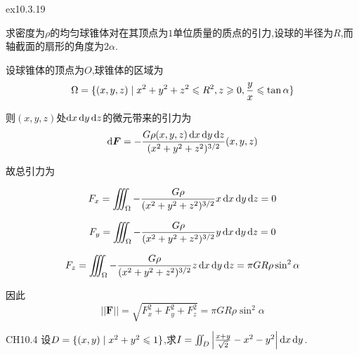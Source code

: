 \begin{exercise}
    {ex10.3.19}


    求密度为$\rho$的均匀球锥体对在其顶点为$1$单位质量的质点的引力,设球的半径为$R$,而轴截面的扇形的角度为$2\alpha$.
\end{exercise}


\begin{solution}
    设球锥体的顶点为$O$,球锥体的区域为$$\Omega = \{ (x,y,z) \mid x^2 + y^2 + z^2 \leqslant R^2, z \geqslant 0, \frac{y}{x} \leqslant \tan \alpha \}$$

    则$(x,y,z)$处$\operatorname{d\!} x \operatorname{d\!} y \operatorname{d\!} z$的微元带来的引力为$$\operatorname{d\!} \bm F = -\frac{G \rho(x,y,z) \operatorname{d\!} x \operatorname{d\!} y \operatorname{d\!} z}{(x^2 + y^2 + z^2)^{3/2}} (x,y,z)$$

    故总引力为

    $$F_x = \iiint_{\Omega} -\frac{G \rho}{(x^2 + y^2 + z^2)^{3/2}} x \operatorname{d\!} x \operatorname{d\!} y \operatorname{d\!} z= 0 $$

    $$F_y = \iiint_{\Omega} -\frac{G \rho}{(x^2 + y^2 + z^2)^{3/2}} y \operatorname{d\!} x \operatorname{d\!} y \operatorname{d\!} z= 0 $$

    $$F_z = \iiint_{\Omega} -\frac{G \rho}{(x^2 + y^2 + z^2)^{3/2}} z \operatorname{d\!} x \operatorname{d\!} y \operatorname{d\!} z = \pi GR \rho \sin^2 \alpha$$

    因此$$|| \bm F|| = \sqrt{F_x^2 + F_y^2 + F_z^2} = \pi GR \rho \sin^2 \alpha$$

\end{solution}

\begin{exercise}
    {CH10.4}
    设$D = \{ (x,y) \mid x^2 + y^2 \leqslant 1 \}$,求$I = \iint_D \left| \frac{x+y}{\sqrt 2} - x^2 - y^2 \right| \operatorname{d\!} x \operatorname{d\!} y$.
\end{exercise}

